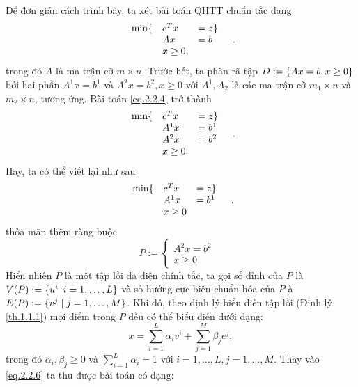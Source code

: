Để đơn giản cách trình bày, ta xét bài toán QHTT chuẩn tắc dạng
\begin{equation}\label{eq.2.2.4}
 \begin{array}{llll}
\min\{& c^Tx &= z\}\\
&Ax &= b &\\
&x \geq 0,
\end{array} .
\end{equation}
trong đó $A$ là ma trận cỡ $m\times n$.
Trước hết, ta phân rã tập $D:= \{Ax=b, x\geq 0\}$ bởi hai phần $A^1x = b^1$ và $A^2x = b^2, x\geq 0$ với $A^1, A_2$ là các ma trận cỡ $m_1\times n$ và $m_2\times n$, tương ứng. Bài toán \eqref{eq.2.2.4} trở thành
\begin{equation}\label{eq.2.2.5}
 \begin{array}{llll}
\min\{&c^Tx &= z\}\\
&A^1x &= b^1 &\\
&A^2x &= b^2 &\\
&x \geq 0.
\end{array}.
\end{equation}
Hay, ta có thể viết lại như sau
\begin{equation}\label{eq.2.2.6}
 \begin{array}{llll}
\min\{&c^Tx &= z\}\\
&A^1x& = b^1&\\
&x \geq 0
\end{array}  .
\end{equation}
thỏa mãn thêm ràng buộc
\begin{equation}\label{eq.2.2.7}
P := \left\{ \begin{array}{lll}
A^2x = b^2&\\
x \geq 0
\end{array} \right .
\end{equation}
Hiển nhiên $P$ là một tập lồi đa diện chính tắc, ta gọi số đỉnh của $P$ là $V(P):=\{u^i\:\; i=1,\dots, L\}$ và số hướng cực biên chuẩn hóa của $P$ à $E(P):=\{v^j\;|\; j=1, \dots, M\}$. Khi đó, theo định lý biểu diễn tập lồi (Định lý \ref{th.1.1.1}) mọi điểm trong $P$ đều có thể biểu diễn dưới dạng:
\begin{equation}\label{eq.2.2.8}
x = \sum_{i=1}^L\alpha_iv^i + \sum_{j=1}^M\beta_je^j,
\end{equation}
trong đó $\alpha_i, \beta_j\geq 0$ và $\sum_{i=1}^L\alpha_i = 1$ với $i=1,\dots, L, j=1,\dots, M$.
Thay vào \eqref{eq.2.2.6} ta thu được bài toán có dạng:
